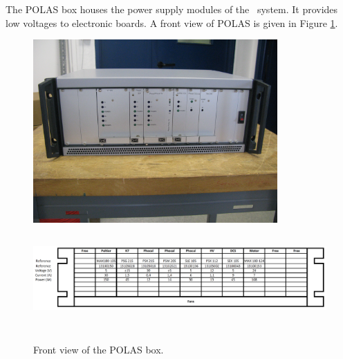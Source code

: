 The POLAS box houses the power supply modules of the \las~system. It provides low voltages to electronic boards. A front view of POLAS is given in Figure \ref{fig:laspolas}.

\begin{figure}[htbp]
\centering
\includegraphics[height=7cm]{figures/polas_photo.jpg}
\hspace*{-1.5cm}
\includegraphics[height=4cm,width=18cm]{figures/polas_faceavant.pdf}
\caption{Front view of the POLAS box.}\label{fig:laspolas}
\end{figure}